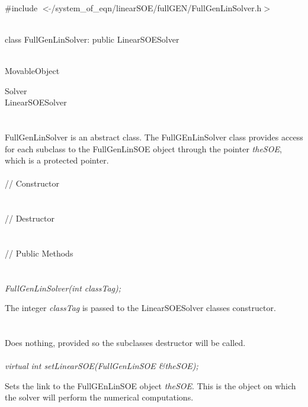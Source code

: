 
   \\
\#include $<\tilde{ }$/system\_of\_eqn/linearSOE/fullGEN/FullGenLinSolver.h$>$  


  \\
class FullGenLinSolver: public LinearSOESolver  


 \\
MovableObject 

\indent\indent  Solver \\
\indent\indent\indent LinearSOESolver \\
\indent\indent\indent{} \\

  \\
\indent FullGenLinSolver is an abstract class.  The FullGEnLinSolver
class provides access for each subclass to the FullGenLinSOE object
through the pointer {\em theSOE}, which is a protected pointer. \\

  \\
\indent\indent // Constructor \\
\indent{}  \\ \\
\indent\indent // Destructor \\
\indent{}\\  \\
\indent\indent // Public Methods \\
\indent{} \\

  \\
{\em FullGenLinSolver(int classTag);}  

The integer {\em classTag} is passed to the LinearSOESolver classes
constructor. \\ 

 \\
\\ 
Does nothing, provided so the subclasses destructor will be called. \\

  \\
{\em virtual int setLinearSOE(FullGenLinSOE \&theSOE);} 

Sets the link to the FullGEnLinSOE object {\em theSOE}. This is the
object on which the solver will perform the numerical computations. \\





